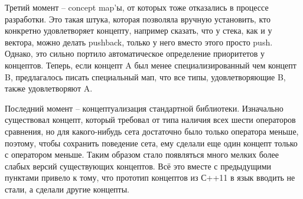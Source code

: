 \documentclass[12pt, a4paper]{article}
\begin{document}
\par Третий момент -- concept map'ы, от которых тоже отказались в процессе разработки. Это такая штука, которая позволяла вручную установить, кто конкретно удовлетворяет концепту, например сказать, что у стека, как и у вектора, можно делать push\textunderscore back, только у него вместо этого просто push. Однако, это сильно портило автоматическое определение приоритетов у концептов. Теперь, если концепт A был менее специализированный чем концепт B, предлагалось писать специальный мап, что все типы, удовлетворяющие B, также удовлетворяют A. 
\par Последний момент -- концептуализация стандартной библиотеки. Изначально существовал концепт, который требовал от типа наличия всех шести операторов сравнения, но для какого-нибудь сета достаточно было только оператора меньше, поэтому, чтобы сохранить поведение сета, ему сделали еще один концепт только с оператором меньше. Таким образом стало появляться много мелких более слабых версий существующих концептов. Всё это вместе с предыдущими пунктами привело к тому, что прототип концептов из С++11 в язык вводить не стали, а сделали другие концепты.
\end{document}
